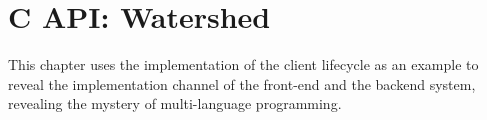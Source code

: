 \begin{savequote}[45mm]
\end{savequote}

\chapter{C API: Watershed} 
\label{ch:c-api}
\begin{content}
This chapter uses the implementation of the client lifecycle as an example to reveal the implementation channel of the front-end  and the backend \cpp{} system, revealing the mystery of  multi-language programming.
\end{content}


